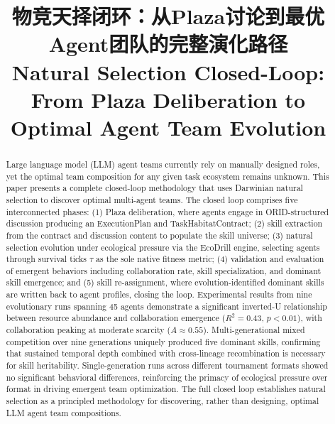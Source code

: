 \documentclass[conference]{IEEEtran}
\begin{document}
\title{物竞天择闭环：从Plaza讨论到最优Agent团队的完整演化路径\\
\large{Natural Selection Closed-Loop: From Plaza Deliberation to Optimal Agent Team Evolution}}

\author{}

\maketitle

\begin{abstract}
Large language model (LLM) agent teams currently rely on manually designed roles, yet the optimal team composition for any given task ecosystem remains unknown. This paper presents a complete closed-loop methodology that uses Darwinian natural selection to discover optimal multi-agent teams. The closed loop comprises five interconnected phases: (1) Plaza deliberation, where agents engage in ORID-structured discussion producing an ExecutionPlan and TaskHabitatContract; (2) skill extraction from the contract and discussion content to populate the skill universe; (3) natural selection evolution under ecological pressure via the EcoDrill engine, selecting agents through survival ticks $\tau$ as the sole native fitness metric; (4) validation and evaluation of emergent behaviors including collaboration rate, skill specialization, and dominant skill emergence; and (5) skill re-assignment, where evolution-identified dominant skills are written back to agent profiles, closing the loop. Experimental results from nine evolutionary runs spanning 45 agents demonstrate a significant inverted-U relationship between resource abundance and collaboration emergence ($R^2=0.43$, $p<0.01$), with collaboration peaking at moderate scarcity ($A\approx0.55$). Multi-generational mixed competition over nine generations uniquely produced five dominant skills, confirming that sustained temporal depth combined with cross-lineage recombination is necessary for skill heritability. Single-generation runs across different tournament formats showed no significant behavioral differences, reinforcing the primacy of ecological pressure over format in driving emergent team optimization. The full closed loop establishes natural selection as a principled methodology for discovering, rather than designing, optimal LLM agent team compositions.
\end{abstract}
\end{document}
